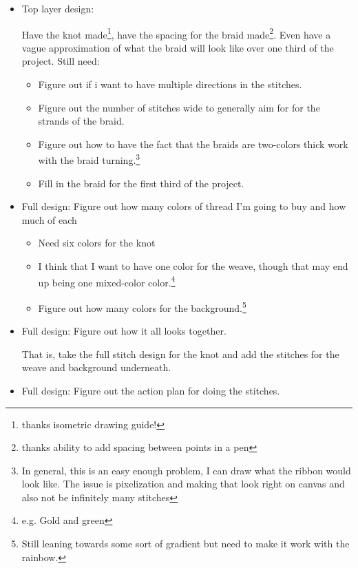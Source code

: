 \documentclass[12pt]{article}
\renewcommand{\,}{\textsuperscript{,}}
\begin{document}
\begin{itemize}
\begin{itemize}
\begin{itemize}
\begin{itemize}
Let's return to the question above about the design.

Ok so lotta open questions there. Mainly just about when if ever to add breaks, and whether to use front and back slashes or just front slashes.

\item Top layer design:

Have the knot made\footnote{thanks isometric drawing guide!}, have the spacing for the braid made\footnote{thanks ability to add spacing between points in a pen}.
Even have a vague approximation of what the braid will look like over one third of the project.
Still need:

\begin{itemize}
\item Figure out if i want to have multiple directions in the stitches.
\item Figure out the number of stitches wide to generally aim for for the strands of the braid.  
\item Figure out how to have the fact that the braids are two-colors thick work with the braid turning.\footnote{In general, this is an easy enough problem, I can draw what the ribbon would look like. The issue is pixelization and making that look right on canvas and also not be infinitely many stitches}
\item Fill in the braid for the first third of the project.
\end{itemize}

\item Full design: Figure out how many colors of thread I'm going to buy and how much of each
\begin{itemize}
\item Need six colors for the knot
\item I think that I want to have one color for the weave, though that may end up being one mixed-color color.\footnote{e.g. Gold and green}
\item Figure out how many colors for the background.\footnote{Still leaning towards some sort of gradient but need to make it work with the rainbow.}
\end{itemize}

\item Full design: Figure out how it all looks together. 

That is, take the full stitch design for the knot and add the stitches for the weave and background underneath.

\item Full design: Figure out the action plan for doing the stitches.


\end{itemize}
\end{itemize}
\end{itemize}
\end{itemize}
\end{document}
